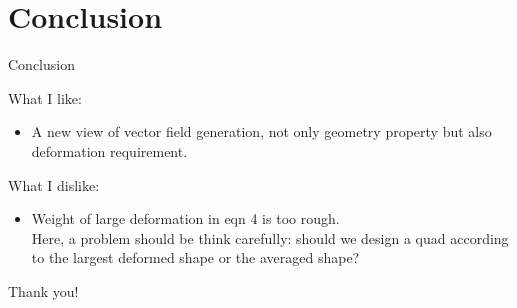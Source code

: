 \documentclass{beamer}
\begin{document}
\section{Conclusion}
\begin{frame}{Conclusion}
\begin{block}{What I like:}
\begin{itemize}
\item A new view of vector field generation, not only geometry property but also deformation requirement.
\end{itemize}
\end{block}

\begin{block}{What I dislike:}
\begin{itemize}
\item Weight of large deformation in eqn 4 is too rough. \\ Here, a problem should be think carefully: should we design a quad according to the largest deformed shape or the averaged shape?
\end{itemize}
\end{block}
\end{frame}

\begin{frame}{}
\hspace{1.5in}\huge{Thank you!}
\end{frame}
\end{document}
